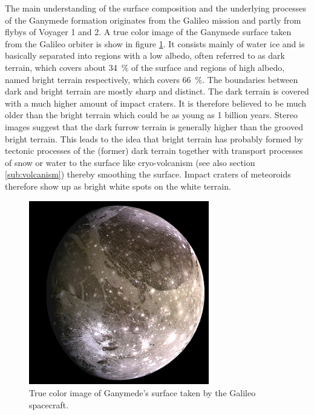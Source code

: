 The main understanding of the surface composition and the underlying
processes of the Ganymede formation originates from the Galileo mission
and partly from flybys of Voyager 1 and 2. A true color image
of the Ganymede surface taken from the Galileo orbiter is show in
figure \ref{fig:Ganymed-true-color}. It consists mainly of water
ice and is basically separated into regions with a low albedo, often
referred to as dark terrain, which covers about 34~\% of the surface
and regions of high albedo, named bright terrain respectively, which
covers 66~\%\cite{bagenal2007jupiter}. The boundaries between dark
and bright terrain are mostly sharp and distinct. The dark terrain
is covered with a much higher amount of impact craters. It is therefore
believed to be much older than the bright terrain which could be as
young as 1 billion years\cite{Showman2004}. Stereo images suggest
that the dark furrow terrain is generally higher than the grooved
bright terrain. This leads to the idea that bright terrain has probably
formed by tectonic processes of the (former) dark terrain together
with transport processes of snow or water to the surface like cryo-volcanism
(see also section \ref{sub:volcanism}) thereby smoothing the surface.
Impact craters of meteoroids therefore show up as bright white spots
on the white terrain\cite{bagenal2007jupiter,Patterson2010,Schenk2001,Showman1997,Showman2004}. 
%
\begin{figure}
\begin{centering}
\includegraphics[width=0.7\textwidth]{Figures/Ganymede_true_color}
\par\end{centering}

\caption{True color image of Ganymede's surface taken by the Galileo spacecraft.\label{fig:Ganymed-true-color}}
\end{figure}
%
%
%
